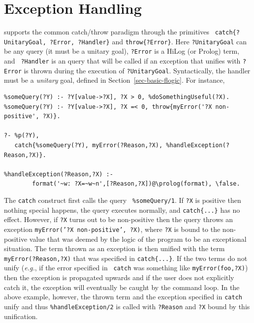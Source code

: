 \documentclass[11pt]{article}
\newcommand{\ERGO}{\mbox{\smaller{\ensuremath{\cal{E}}\smaller{{\sc{RGO}}}}}\xspace}
\newcommand{\FLSYSTEM}{\ERGO}
\begin{document}
\section{Exception Handling}\label{sec-errors}

\FLSYSTEM supports the common catch/throw paradigm through the primitives {\tt
  catch\{?UnitaryGoal, ?Error, ?Handler\}} and {\tt throw\{?Error\}}.  Here
{\tt ?UnitaryGoal}
can be any \FLSYSTEM query (it must be a unitary goal), {\tt ?Error} is a HiLog (or Prolog) term, and {\tt
  ?Handler} is an \FLSYSTEM query that will be called if an exception that
unifies with {\tt ?Error} is thrown during the execution of {\tt ?UnitaryGoal}. 
Syntactically, the handler must be a \emph{unitary} goal, defined in
Section~\ref{sec-basic-flogic}.
For instance,

\begin{verbatim}
%someQuery(?Y) :- ?Y[value->?X], ?X > 0, %doSomethingUseful(?X).  
%someQuery(?Y) :- ?Y[value->?X], ?X =< 0, throw{myError('?X non-positive', ?X)}.

?- %p(?Y),
   catch{%someQuery(?Y), myError(?Reason,?X), %handleException(?Reason,?X)}.

%handleException(?Reason,?X) :-
        format('~w: ?X=~w~n',[?Reason,?X])@\prolog(format), \false.
\end{verbatim}
The {\tt catch} construct first calls the query {\tt
  \verb|%|someQuery/1}. If {\tt ?X} is positive then nothing special
  happens, the query executes normally, and {\tt catch\{...\}} has no
  effect.  However, if {\tt ?X} turns out to be non-positive then the
  query throws an exception {\tt myError('?X {\tt non-positive', ?X)}},
  where {\tt ?X} is bound to the non-positive value that was deemed by
  the logic of the program to be an exceptional situation.  The term
  thrown as an exception is then unified with the term {\tt
  myError(?Reason,?X)} that was specified in {\tt catch\{...\}}. If the
  two terms do not unify ({\it e.g.}, if the error specified in {\tt
  catch} was something like {\tt myError(foo,?X)}) then the exception is
  propagated upwards and if the user does not explicitly catch it, the
  exception will eventually be caught by the \FLSYSTEM command loop. In the
  above example,
  however, the thrown term and the exception specified in
  {\tt catch} unify and thus {\tt \verb|%|handleException/2} is called
  with {\tt ?Reason} and {\tt ?X} bound by this unification.
\end{document}
